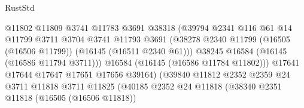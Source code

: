 \begin{lexlean}{RustStd}
\begin{coremodule}
                                            @11802
                                            @11809
                                            @3741
                                            @11783
                                            @3691
                                            @38318
                                            (@39794
                                              @2341
                                              @116
                                              @61
                                              @14
                                              @11799
                                              @3711
                                              @3704
                                              @3741
                                              @11793
                                              @3691
                                              (@38278
                                                @2340
                                                @11799
                                                (@16505 (@16506 @11799))
                                                (@16145 (@16511 @2340 @61)))
                                              @38245
                                              @16584
                                              (@16145 (@16586 @11794 @3711)))
                                            @16584
                                            (@16145 (@16586 @11784 @11802)))
                                          @17641
                                          @17644
                                          @17647
                                          @17651
                                          @17656
                                          @39164)
                                        (@39840
                                          @11812
                                          @2352
                                          @2359
                                          @24
                                          @3711
                                          @11818
                                          @3711
                                          @11825
                                          (@40185
                                            @2352
                                            @24
                                            @11818
                                            (@38340
                                              @2351
                                              @11818
                                              (@16505 (@16506 @11818))

\end{coremodule}
\end{lexlean}
